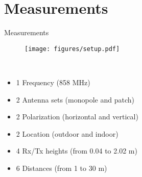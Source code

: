 \documentclass[10pt]{beamer}
\begin{document}
\section{Measurements}
\begin{frame}{Measurements}
\begin{figure}[!htbp]
	\centering
	\texttt{[image: figures/setup.pdf]}
\end{figure}
\begin{minipage}{0.15\textwidth}
 \textcolor{white}{.}  
\end{minipage}%
\begin{minipage}{0.8\textwidth}
\begin{itemize}
\item 1 Frequency (858 MHz)
\item 2 Antenna sets (monopole and patch)
\item 2 Polarization (horizontal and vertical)
\item 2 Location (outdoor and indoor)
\item 4 Rx/Tx heights (from 0.04 to 2.02 m)
\item 6 Distances (from 1 to 30 m)
\end{itemize}
\end{minipage}
\end{frame}

\end{document}
